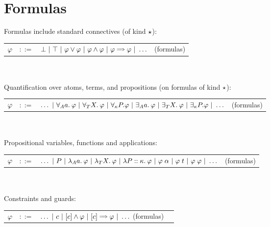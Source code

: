 \documentclass[english, mgr]{iithesis}
\begin{document}
\section{Formulas}
Formulas include standard connectives (of kind $\star$):

\begin{tabular}{rrlr}
$\varphi$ & $::=$ & $\bot
               \bnfor \top
               \bnfor \formphi \vee \formphi
               \bnfor \formphi \wedge \formphi
               \bnfor \formphi \fImp \formphi
               \bnfor \ldots $ & (formulas)
\end{tabular}
\\ \\
Quantification over atoms, terms, and propositions (on formulas of kind $\star$):
\newcommand\fForallProp[2]{\forall_{#2} #1 .}
\newcommand\fExistsProp[2]{\exists_{#2} #1 .}

\begin{tabular}{rrlr}
$\varphi$ & $::=$ & $\ldots
               \bnfor \fForallAtom{\atomv} \formphi
               \bnfor \fForallTerm{\termv} \formphi
               \bnfor \fForallProp{\propv}{\kind} \formphi
               \bnfor \fExistsAtom{\atomv} \formphi
               \bnfor \fExistsTerm{\termv} \formphi
               \bnfor \fExistsProp{\propv}{\kind} \formphi
               \bnfor \ldots$
    & (formulas)
\end{tabular}
\\ \\
Propositional variables, functions and applications:

\begin{tabular}{rrlr}
$\varphi$ & $::=$ & $\ldots
               \ |\  P
               \ |\  \lambda_A a .\: \varphi
               \ |\  \lambda_T X .\: \varphi
               \ |\  \lambda P :: \kappa.\: \varphi
               \ |\  \varphi \;\alpha
               \ |\  \varphi \;t
               \ |\  \varphi \; \varphi
               \ |\  \ldots$
    & (formulas)
\end{tabular}
\\ \\
Constraints and guards:

\begin{tabular}{rrlr}
$\varphi$ & $::=$ & $\ldots
               \bnfor \fConstr{\constr}
               \bnfor \fCAnd{\constr} \formphi
               \bnfor \fCImp{\constr} \formphi
               \bnfor \ldots$  (formulas)
\end{tabular}
\end{document}
